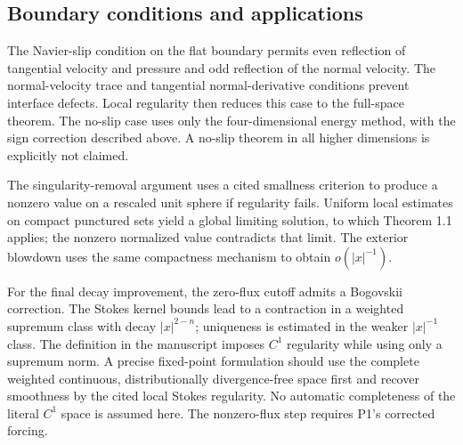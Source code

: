 \documentclass[10pt]{article}
\begin{document}
\subsection*{Boundary conditions and applications}
The Navier-slip condition on the flat boundary permits even reflection of tangential velocity and pressure and odd reflection of the normal velocity. The normal-velocity trace and tangential normal-derivative conditions prevent interface defects. Local regularity then reduces this case to the full-space theorem. The no-slip case uses only the four-dimensional energy method, with the sign correction described above. A no-slip theorem in all higher dimensions is explicitly not claimed.\par
The singularity-removal argument uses a cited smallness criterion to produce a nonzero value on a rescaled unit sphere if regularity fails. Uniform local estimates on compact punctured sets yield a global limiting solution, to which Theorem 1.1 applies; the nonzero normalized value contradicts that limit. The exterior blowdown uses the same compactness mechanism to obtain \(o(|x|^{-1})\).\par
For the final decay improvement, the zero-flux cutoff admits a Bogovskii correction. The Stokes kernel bounds lead to a contraction in a weighted supremum class with decay \(|x|^{2-n}\); uniqueness is estimated in the weaker \(|x|^{-1}\) class. The definition in the manuscript imposes \(C^1\) regularity while using only a supremum norm. A precise fixed-point formulation should use the complete weighted continuous, distributionally divergence-free space first and recover smoothness by the cited local Stokes regularity. No automatic completeness of the literal \(C^1\) space is assumed here. The nonzero-flux step requires P1’s corrected forcing.\par
\end{document}
